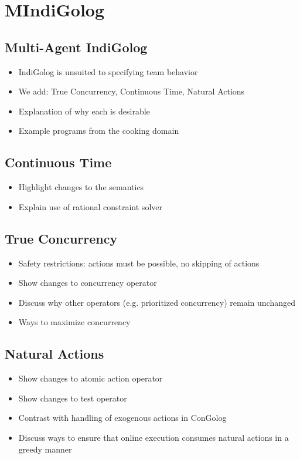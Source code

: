 \chapter{MIndiGolog}\label{ch:mindigolog}

\section{Multi-Agent IndiGolog}
\begin{itemize}
\item IndiGolog is unsuited to specifying team behavior
\item We add: True Concurrency, Continuous Time, Natural Actions
\item Explanation of why each is desirable
\item Example programs from the cooking domain
\end{itemize}

\section{Continuous Time}
\begin{itemize}
\item Highlight changes to the semantics
\item Explain use of rational constraint solver
\end{itemize}

\section{True Concurrency}
\begin{itemize}
\item Safety restrictions: actions must be possible, no skipping of actions
\item Show changes to concurrency operator
\item Discuss why other operators (e.g. prioritized concurrency) remain unchanged
\item Ways to maximize concurrency
\end{itemize}

\section{Natural Actions}
\begin{itemize}
\item Show changes to atomic action operator
\item Show changes to test operator
\item Contrast with handling of exogenous actions in ConGolog
\item Discuss ways to ensure that online execution consumes natural actions
in a greedy manner
\end{itemize}

